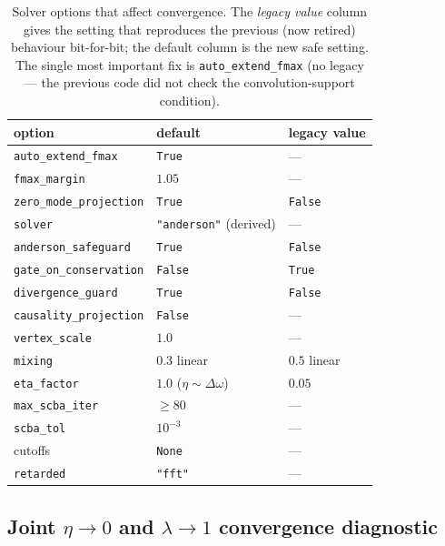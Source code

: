 \begin{table}[ht]
  \centering
  \begin{tabular}{lll}
    \hline
    option & default & legacy value \\
    \hline
    \texttt{auto\_extend\_fmax}       & \texttt{True}      & --- \\
    \texttt{fmax\_margin}             & $1.05$             & --- \\
    \texttt{zero\_mode\_projection}   & \texttt{True}      & \texttt{False} \\
    \texttt{solver}                   & \texttt{"anderson"} (derived) & --- \\
    \texttt{anderson\_safeguard}      & \texttt{True}      & \texttt{False} \\
    \texttt{gate\_on\_conservation}   & \texttt{False}     & \texttt{True} \\
    \texttt{divergence\_guard}        & \texttt{True}      & \texttt{False} \\
    \texttt{causality\_projection}    & \texttt{False}     & --- \\
    \texttt{vertex\_scale}            & $1.0$              & --- \\
    \texttt{mixing}                   & $0.3$ linear       & $0.5$ linear \\
    \texttt{eta\_factor}              & $1.0$
       ($\eta\sim\Delta\omega$) & $0.05$ \\
    \texttt{max\_scba\_iter}          & $\ge 80$           & --- \\
    \texttt{scba\_tol}                & $10^{-3}$          & --- \\
    cutoffs                           & \texttt{None}      & --- \\
    \texttt{retarded}                 & \texttt{"fft"}     & --- \\
    \hline
  \end{tabular}
  \caption{Solver options that affect convergence. The \emph{legacy
  value} column gives the setting that reproduces the previous (now
  retired) behaviour bit-for-bit; the default column is the new safe
  setting. The single most important fix is
  \texttt{auto\_extend\_fmax} (no legacy --- the previous code did
  not check the convolution-support condition).}
  \label{tab:solver_recommended}
\end{table}

\subsection[Joint eta->0 and lambda->1 convergence diagnostic]{Joint $\eta\!\to\!0$ and $\lambda\!\to\!1$ convergence diagnostic}
\label{sec:phonon_solver:eta_lambda_diag}

